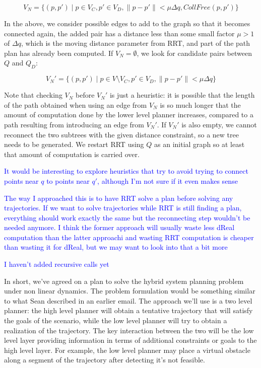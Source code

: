 \documentclass[12pt]{article}
\newcommand\fran[1]{\textcolor{blue}{#1}}
\begin{document}
\begin{equation}
    \label{eq:checked_candidates}
    V_N = \{(p, p') \mid p \in V_C, p' \in V_D, \|p - p'\| < \mu \Delta q, CollFree(p, p')\}
\end{equation}

In the above, we consider possible edges to add to the graph so that it becomes connected again, the added pair has a distance less than some small factor $\mu > 1$ of $\Delta q$, which is the moving distance parameter from RRT, and part of the path plan has already been computed. If $V_N = \emptyset$, we look for candidate pairs between $Q$ and $Q_D$:

\begin{equation}
    \label{eq:unchecked_candidates}
    V_N' = \{(p, p') \mid p \in V \setminus V_C, p' \in V_D, \|p - p'\| < \mu \Delta q\}
\end{equation}

Note that checking $V_N$ before $V_N'$ is just a heuristic: it is possible that the length of the path obtained when using an edge from $V_N$ is so much longer that the amount of computation done by the lower level planner increases, compared to a path resulting from introducing an edge from $V_N'$. If $V_N'$ is also empty, we cannot reconnect the two subtrees with the given distance constraint, so a new tree needs to be generated. We restart RRT using $Q$ as an initial graph so at least that amount of computation is carried over.

\fran{It would be interesting to explore heuristics that try to avoid trying to connect points near $q$ to points near $q'$, although I'm not sure if it even makes sense}

\fran{The way I approached this is to have RRT solve a plan before solving any trajectories. If we want to solve trajectories while RRT is still finding a plan, everything should work exactly the same but the reconnecting step wouldn't be needed anymore. I think the former approach will usually waste less dReal computation than the latter approachi and wasting RRT computation is cheaper than wasting it for dReal, but we may want to look into that a bit more}

\fran{I haven't added recursive calls yet}

\iffalse
In short, we've agreed on a plan to solve the hybrid system planning problem under non linear dynamics. The problem formulation would be something similar to what Sean described in an earlier email. The approach we'll use is a two level planner: the high level planner will obtain a tentative trajectory that will satisfy the goals of the scenario, while the low level planner will try to obtain a realization of the trajectory. The key interaction between the two will be the low level layer providing information in terms of additional constraints or goals to the high level layer. For example, the low level planner may place a virtual obstacle along a segment of the trajectory after detecting it's not feasible.
\end{document}
